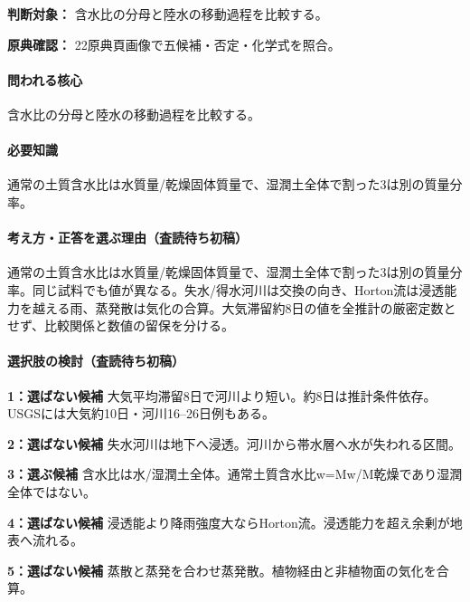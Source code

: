 \noindent\textbf{判断対象：} 含水比の分母と陸水の移動過程を比較する。\par

\noindent\textbf{原典確認：} 22原典頁画像で五候補・否定・化学式を照合。\par

\paragraph{問われる核心} 含水比の分母と陸水の移動過程を比較する。

\paragraph{必要知識} 通常の土質含水比は水質量/乾燥固体質量で、湿潤土全体で割った3は別の質量分率。

\paragraph{考え方・正答を選ぶ理由（査読待ち初稿）} 通常の土質含水比は水質量/乾燥固体質量で、湿潤土全体で割った3は別の質量分率。同じ試料でも値が異なる。失水/得水河川は交換の向き、Horton流は浸透能力を越える雨、蒸発散は気化の合算。大気滞留約8日の値を全推計の厳密定数とせず、比較関係と数値の留保を分ける。

\paragraph{選択肢の検討（査読待ち初稿）}\mbox{}\par

\noindent\textbf{1：選ばない候補} 大気平均滞留8日で河川より短い。約8日は推計条件依存。USGSには大気約10日・河川16–26日例もある。\par

\noindent\textbf{2：選ばない候補} 失水河川は地下へ浸透。河川から帯水層へ水が失われる区間。\par

\noindent\textbf{3：選ぶ候補} 含水比は水/湿潤土全体。通常土質含水比w=\allowbreak{}Mw/M乾燥であり湿潤全体ではない。\par

\noindent\textbf{4：選ばない候補} 浸透能より降雨強度大ならHorton流。浸透能力を超え余剰が地表へ流れる。\par

\noindent\textbf{5：選ばない候補} 蒸散と蒸発を合わせ蒸発散。植物経由と非植物面の気化を合算。\par

